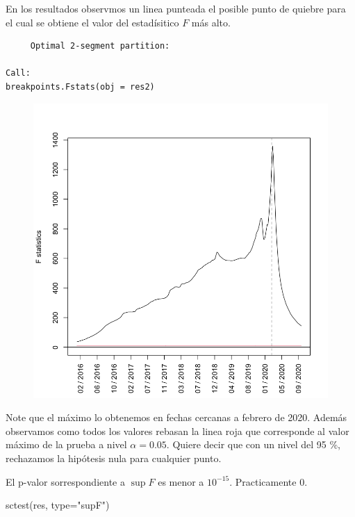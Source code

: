 \documentclass[
]{article}
\newenvironment{Shaded}{}{}
\newcommand{\AttributeTok}[1]{\textcolor[rgb]{0.49,0.56,0.16}{#1}}
\newcommand{\FunctionTok}[1]{\textcolor[rgb]{0.02,0.16,0.49}{#1}}
\newcommand{\NormalTok}[1]{#1}
\newcommand{\StringTok}[1]{\textcolor[rgb]{0.25,0.44,0.63}{#1}}
\begin{document}
En los resultados observmos un linea punteada el posible punto de
quiebre para el cual se obtiene el valor del estadísitico \(F\) más
alto.

\begin{verbatim}
	 Optimal 2-segment partition:

Call:
breakpoints.Fstats(obj = res2)
\end{verbatim}

\begin{figure}
\centering
\includegraphics{../plots/structChange_files/structChange_9_1.png}
\caption{}
\end{figure}

Note que el máximo lo obtenemos en fechas cercanas a febrero de 2020.
Además observamos como todos los valores rebasan la linea roja que
corresponde al valor máximo de la prueba a nivel \(\alpha=0.05\). Quiere
decir que con un nivel del 95 \%, rechazamos la hipótesis nula para
cualquier punto.

El p-valor sorrespondiente a \(\sup F\) es menor a \(10^{-15}\).
Practicamente 0.

\begin{Shaded}
\begin{Highlighting}[]
\FunctionTok{sctest}\NormalTok{(res, }\AttributeTok{type=}\StringTok{"supF"}\NormalTok{)}
\end{Highlighting}
\end{Shaded}
\end{document}
